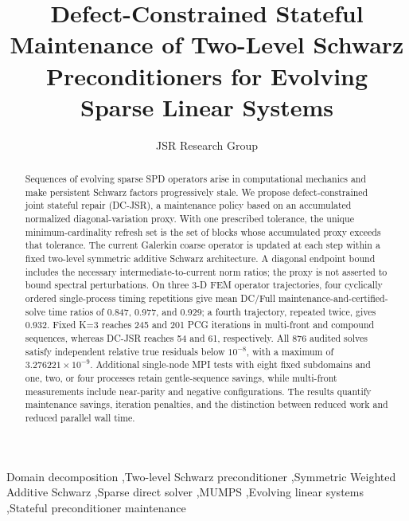 \documentclass[preprint,12pt,3p]{elsarticle}
\begin{document}
\begin{frontmatter}

\title{Defect-Constrained Stateful Maintenance of Two-Level Schwarz Preconditioners for Evolving Sparse Linear Systems}

\author[inst1]{JSR Research Group}


\begin{abstract}
Sequences of evolving sparse SPD operators arise in computational mechanics and make persistent Schwarz factors progressively stale. We propose defect-constrained joint stateful repair (DC-JSR), a maintenance policy based on an accumulated normalized diagonal-variation proxy. With one prescribed tolerance, the unique minimum-cardinality refresh set is the set of blocks whose accumulated proxy exceeds that tolerance. The current Galerkin coarse operator is updated at each step within a fixed two-level symmetric additive Schwarz architecture. A diagonal endpoint bound includes the necessary intermediate-to-current norm ratios; the proxy is not asserted to bound spectral perturbations. On three 3-D FEM operator trajectories, four cyclically ordered single-process timing repetitions give mean DC/Full maintenance-and-certified-solve time ratios of 0.847, 0.977, and 0.929; a fourth trajectory, repeated twice, gives 0.932. Fixed K=3 reaches 245 and 201 PCG iterations in multi-front and compound sequences, whereas DC-JSR reaches 54 and 61, respectively. All 876 audited solves satisfy independent relative true residuals below $10^{-8}$, with a maximum of $3.276221\times10^{-9}$. Additional single-node MPI tests with eight fixed subdomains and one, two, or four processes retain gentle-sequence savings, while multi-front measurements include near-parity and negative configurations. The results quantify maintenance savings, iteration penalties, and the distinction between reduced work and reduced parallel wall time.
\end{abstract}

\begin{keyword}
Domain decomposition \sep Two-level Schwarz preconditioner \sep Symmetric Weighted Additive Schwarz \sep Sparse direct solver \sep MUMPS \sep Evolving linear systems \sep Stateful preconditioner maintenance
\end{keyword}

\end{frontmatter}
\end{document}
